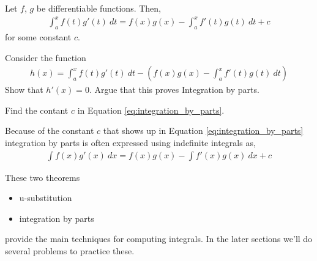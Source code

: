 \begin{theorem}
	Let $f$, $g$ be differentiable functions. Then,
	\begin{align}
		\label{eq:integration_by_parts}
		\int_a^x f(t) g'(t)\: dt = f(x)g(x) - \int_{a}^{x} f'(t) g(t) \: dt + c
	\end{align}
	for some constant $c$.
\end{theorem}
\begin{exercise} Consider the function
	\begin{align*}
		h(x)
		=
		\int_a^x f(t) g'(t)\: dt - \left(f(x)g(x) - \int_{a}^{x} f'(t) g(t) \: dt \right)
	\end{align*}
Show that $h'(x) = 0$. Argue that this proves Integration by parts.
\end{exercise}

\begin{exercise}
	Find the contant $c$ in Equation \eqref{eq:integration_by_parts}.
\end{exercise}

Because of the constant $c$ that shows up in Equation \eqref{eq:integration_by_parts} integration by parts is often expressed using indefinite integrals as,
\begin{align*}
	\int f(x) g'(x)\: dx = f(x)g(x) - \int f'(x) g(x) \: dx + c
\end{align*}

\begin{remark}
	These two theorems
	\begin{itemize}
		\item u-substitution
		\item integration by parts
	\end{itemize}
	provide the main techniques for computing integrals. In the later sections we'll do several problems to practice these.
\end{remark}
